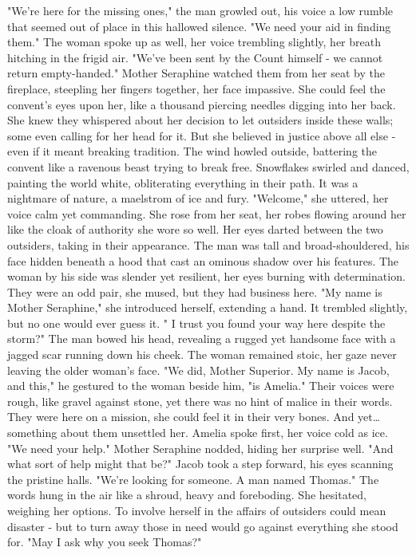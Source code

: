\documentclass[11pt]{article}
\begin{document}
"We're here for the missing ones," the man growled out, his voice a low rumble that seemed out of place in this hallowed silence. "We need your aid in finding them."
The woman spoke up as well, her voice trembling slightly, her breath hitching in the frigid air. "We've been sent by the Count himself - we cannot return empty-handed."
Mother Seraphine watched them from her seat by the fireplace, steepling her fingers together, her face impassive. She could feel the convent's eyes upon her, like a thousand piercing needles digging into her back. She knew they whispered about her decision to let outsiders inside these walls; some even calling for her head for it. But she believed in justice above all else - even if it meant breaking tradition. The wind howled outside, battering the convent like a ravenous beast trying to break free. Snowflakes swirled and danced, painting the world white, obliterating everything in their path. It was a nightmare of nature, a maelstrom of ice and fury.
"Welcome," she uttered, her voice calm yet commanding. She rose from her seat, her robes flowing around her like the cloak of authority she wore so well. Her eyes darted between the two outsiders, taking in their appearance. The man was tall and broad-shouldered, his face hidden beneath a hood that cast an ominous shadow over his features. The woman by his side was slender yet resilient, her eyes burning with determination. They were an odd pair, she mused, but they had business here. 
"My name is Mother Seraphine," she introduced herself, extending a hand. It trembled slightly, but no one would ever guess it. " I trust you found your way here despite the storm?"
The man bowed his head, revealing a rugged yet handsome face with a jagged scar running down his cheek. The woman remained stoic, her gaze never leaving the older woman's face. "We did, Mother Superior. My name is Jacob, and this," he gestured to the woman beside him, "is Amelia."
Their voices were rough, like gravel against stone, yet there was no hint of malice in their words. They were here on a mission, she could feel it in their very bones. And yet\ldots{} something about them unsettled her.
Amelia spoke first, her voice cold as ice. "We need your help."
Mother Seraphine nodded, hiding her surprise well. "And what sort of help might that be?"
Jacob took a step forward, his eyes scanning the pristine halls. "We're looking for someone. A man named Thomas."
The words hung in the air like a shroud, heavy and foreboding. She hesitated, weighing her options. To involve herself in the affairs of outsiders could mean disaster - but to turn away those in need would go against everything she stood for. "May I ask why you seek Thomas?"
\end{document}
